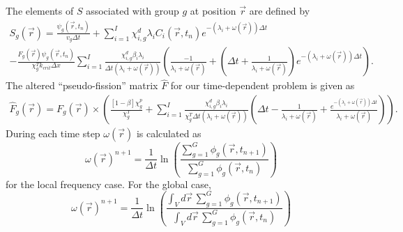 \documentclass[12pt]{report}
\begin{document}
	The elements of $S$ associated with group $g$ at position $\vec{r}$ are defined by
	\begin{eqnarray}
	S_g(\vec{r}) = 	\frac{\psi_g(\vec{r},t_{n})}{v_g \Delta t} +  \sum_{i=1}^{I} \chi_{i,g}^d \lambda_i C_i(\vec{r},t_{n}) e^{-\left(\lambda_i + \omega(\vec{r})\right) \Delta t} \nonumber \\
	-  \frac{F_g(\vec{r}) \psi_g(\vec{r},t_{n})}{\chi_g^T k_{crit} \Delta x} \sum_{i=1}^{I} \frac{\chi_{i,g}^d \beta_i \lambda_i}{\Delta t \left( \lambda_i + \omega(\vec{r}) \right)} \left( \frac{-1}{\lambda_i + \omega(\vec{r})} + \left(\Delta t + \frac{1}{\lambda_i + \omega(\vec{r})} \right)e^{-\left(\lambda_i + \omega(\vec{r}) \right) \Delta t} \right).
	\end{eqnarray}
    The altered ``pseudo-fission'' matrix $\hat{F}$ for our time-dependent problem is given as
	\begin{eqnarray}
	\hat{F}_g(\vec{r}) = F_g(\vec{r}) \times \left(\frac{\left[ 1- \beta \right] \chi_g^p}{\chi_g^T} + \sum_{i=1}^{I} \frac{\chi_{i,g}^d \beta_i \lambda_i}{\chi_g^T \Delta t \left( \lambda_i + \omega(\vec{r}) \right)} \left( \Delta t - \frac{1}{\lambda_i + \omega(\vec{r})} + \frac{e^{-\left( \lambda_i + \omega(\vec{r}) \right) \Delta t}}{\lambda_i + \omega(\vec{r})}\right) \right) \nonumber.
	\end{eqnarray}
	During each time step $\omega(\vec{r})$ is calculated as
	\begin{equation}
	\omega(\vec{r})^{n+1} = \frac{1}{\Delta t} \ln \left(\frac{\sum_{g=1}^{G} \phi_g(\vec{r}, t_{n+1})}{\sum_{g=1}^{G} \phi_g(\vec{r}, t_{n})} \right)
	\end{equation}
	for the local frequency case. For the global case,
	\begin{equation}
	\omega(\vec{r})^{n+1} = \frac{1}{\Delta t} \ln \left(\frac{\int_{V} d\vec{r} \, \sum_{g=1}^{G} \phi_g(\vec{r}, t_{n+1})}{\int_{V} d\vec{r} \,\sum_{g=1}^{G} \phi_g(\vec{r}, t_{n})} \right)
	\end{equation}	
	
		
\end{document}
